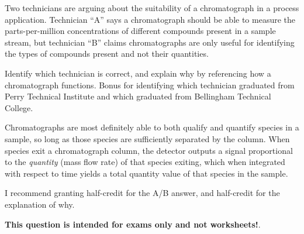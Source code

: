 

Two technicians are arguing about the suitability of a chromatograph in a process application.  Technician ``A'' says a chromatograph should be able to measure the parts-per-million concentrations of different compounds present in a sample stream, but technician ``B'' claims chromatographs are only useful for identifying the types of compounds present and not their quantities.

Identify which technician is correct, and explain why by referencing how a chromatograph functions.  Bonus for identifying which technician graduated from Perry Technical Institute and which graduated from Bellingham Technical College.

\vskip 50pt







Chromatographs are most definitely able to both qualify and quantify species in a sample, so long as those species are sufficiently separated by the column.  When species exit a chromatograph column, the detector outputs a signal proportional to the {\it quantity} (mass flow rate) of that species exiting, which when integrated with respect to time yields a total quantity value of that species in the sample.

\vskip 10pt

I recommend granting half-credit for the A/B answer, and half-credit for the explanation of why.







{\bf This question is intended for exams only and not worksheets!}.



